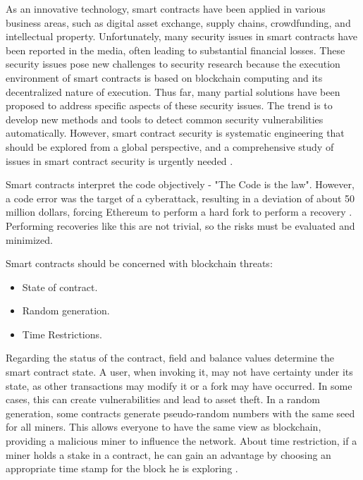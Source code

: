 As an innovative technology, smart contracts have been applied in various business areas, such as digital asset exchange, supply chains, crowdfunding, and intellectual property. Unfortunately, many security issues in smart contracts have been reported in the media, often leading to substantial financial losses. These security issues pose new challenges to security research because the execution environment of smart contracts is based on blockchain computing and its decentralized nature of execution. Thus far, many partial solutions have been proposed to address specific aspects of these security issues. The trend is to develop new methods and tools to detect common security vulnerabilities automatically. However, smart contract security is systematic engineering that should be explored from a global perspective, and a comprehensive study of issues in smart contract security is urgently needed \cite{huang2019smart}.

Smart contracts interpret the code objectively - "The Code is the law". However, a code error was the target of a cyberattack, resulting in a deviation of about 50 million dollars, forcing Ethereum to perform a hard fork to perform a recovery \cite{bashir2018mastering}. Performing recoveries like this are not trivial, so the risks must be evaluated and minimized.

Smart contracts should be concerned with blockchain threats:
\begin{itemize}
\item State of contract.
\item Random generation.
\item Time Restrictions.
\end{itemize}

Regarding the status of the contract, field and balance values determine the smart contract state. A user, when invoking it, may not have certainty under its state, as other transactions may modify it or a fork may have occurred. In some cases, this can create vulnerabilities and lead to asset theft. In a random generation, some contracts generate pseudo-random numbers with the same seed for all miners. This allows everyone to have the same view as blockchain, providing a malicious miner to influence the network. About time restriction, if a miner holds a stake in a contract, he can gain an advantage by choosing an appropriate time stamp for the block he is exploring \cite{greve2018blockchain}.